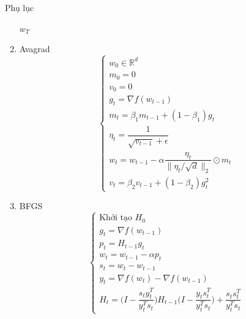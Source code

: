 \documentclass[10pt]{beamer}
\theoremstyle{remark}
\theoremstyle{definition}
\begin{document}
\begin{frame}[allowframebreaks]{Phụ lục}
\begin{enumerate}
{\begin{minipage}{1.2 \linewidth}
\begin{algorithm}[H]
\begin{algorithmic}[1]
								\Else
								\EndIf
							\EndFor
							\State \Return $w_T$
						\end{algorithmic}
					\end{algorithm}
				\end{minipage}
			}
		\endgroup
		\item Avagrad
		\begin{equation*}
			\begin{cases} w_0 \in \mathbb{R}^d \\ m_0 = 0 \\ v_0 = 0 \\
			g_t = \nabla f(w_{t-1}) \\
			m_t = \beta_1 m_{t-1} + (1-\beta_1)g_t \\
			\eta_t = \dfrac{1}{\sqrt{v_{t-1}} + \epsilon} \\
			w_t = w_{t-1} - \alpha \dfrac{\eta_t}{\lVert \eta_t / \sqrt{d} \rVert_2} \odot m_t \\
			v_t = \beta_2 v_{t-1} + (1 - \beta_2) g_t^2\end{cases}
		\end{equation*}
		\item BFGS
		\begin{equation*}
			\begin{cases} \text{Khởi tạo } H_0 \\
			g_t = \nabla f(w_{t-1}) \\
			p_t = H_{t-1} g_t \\
			w_t = w_{t-1} - \alpha p_t \\
			s_t = w_t - w_{t-1} \\
			y_t = \nabla f(w_t) - \nabla f(w_{t-1}) \\
			H_t = \Bigg(I - \dfrac{s_t y_t^T}{y_t^T s_t} \Bigg)H_{t-1}\Bigg( I - \dfrac{y_t s_t^T}{y_t^T s_t} \Bigg) + \dfrac{s_t s_t^T}{y_t^T s_t}\end{cases}

\end{equation*}
\end{enumerate}
\end{frame}
\end{document}
